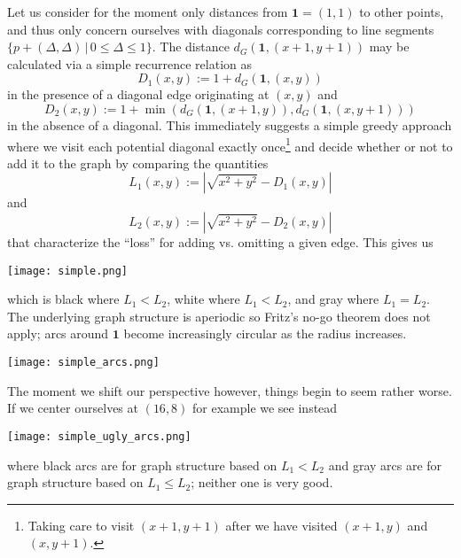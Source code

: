 \documentclass[letterpaper]{article}
\begin{document}
Let us consider for the moment only distances from $\mathbf{1} = (1, 1)$ to other points, and
thus only concern ourselves with diagonals corresponding to line segments $\{p + (\Delta,
\Delta) \, | \, 0 \leq \Delta \leq 1\}$. The distance $d_G(\mathbf{1}, (x+1, y+1))$ may be
calculated via a simple recurrence relation as
\begin{equation*}
  D_1(x, y) := 1 + d_G(\mathbf{1}, (x, y))
\end{equation*}
in the presence of a diagonal edge originating at $(x, y)$ and
\begin{equation*}
  D_2(x, y) := 1 + \min(d_G(\mathbf{1}, (x + 1, y)), d_G(\mathbf{1}, (x, y + 1)))
\end{equation*}
in the absence of a diagonal. This immediately suggests a simple greedy approach where we
visit each potential diagonal exactly once\footnote{Taking care to visit $(x+1, y+1)$ after
we have visited $(x+1,y)$ and $(x,y+1)$.} and decide whether or not to add it to the graph by
comparing the quantities
\begin{equation*}
  L_1(x, y) := |\sqrt{x^2 + y^2} - D_1(x, y)|
\end{equation*}
and
\begin{equation*}
  L_2(x, y) := |\sqrt{x^2 + y^2} - D_2(x, y)|
\end{equation*}
that characterize the ``loss'' for adding vs. omitting a given edge. This gives us
\begin{center}
  \texttt{[image: simple.png]}
\end{center}
which is black where $L_1 < L_2$, white where $L_1 < L_2$, and gray where $L_1 = L_2$. The
underlying graph structure is aperiodic so Fritz's no-go theorem does not apply; arcs around
$\mathbf{1}$ become increasingly circular as the radius increases.
\begin{center}
  \texttt{[image: simple\_arcs.png]}
\end{center}

The moment we shift our perspective however, things begin to seem rather worse. If we center
ourselves at $(16, 8)$ for example we see instead
\begin{center}
  \texttt{[image: simple\_ugly\_arcs.png]}
\end{center}
where black arcs are for graph structure based on $L_1 < L_2$ and gray arcs are for graph
structure based on $L_1 \leq L_2$; neither one is very good.
\end{document}
